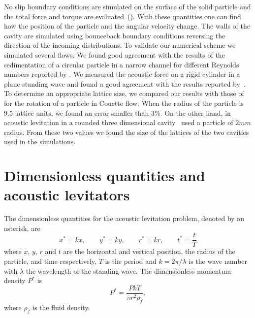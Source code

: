 No slip boundary conditions are simulated on the surface of the solid particle and 
the total force and torque are evaluated~(\cite{aidun98}). With these quantities one can 
find how the position of the particle and the angular velocity change. The walls of the 
cavity are simulated using bounceback boundary conditions reversing the direction of the 
incoming distributions. To validate our numerical scheme we simulated several flows.
We found good agreement with the results of the sedimentation of a circular particle in a 
narrow channel for different Reynolds numbers reported by \cite{feng94}. We measured the 
acoustic force on a rigid cylinder in a plane standing wave and found a good agreement with
the results reported by~\cite{haydock05}. To determine an appropriate lattice size, we 
compared our results with those of~\cite{poe75} for the rotation of a particle in Couette 
flow. When the radius of the particle is 9.5 lattice units, we found an error smaller 
than 3\%. On the other hand, in acoustic levitation in a rounded three dimensional 
cavity~\cite{xie01} used a particle of $2 mm$  radius. From these two values we 
found  the size of the lattices of the two cavities used in the simulations.



\section{\label{sec:acoustic} Dimensionless quantities and acoustic levitators}

The dimensionless quantities for the acoustic levitation problem, denoted by an asterisk,  
are
\begin{equation}
 x^\ast=kx,\qquad y^\ast=ky,\qquad r^\ast=kr,\qquad t^\ast = \frac{t}{T}
\end{equation}
where $x$, $y$, $r$ and $t$ are the horizontal and vertical position, the radius of the
particle, and time respectively, 
$T$ is the period and $k=2\pi/\lambda$ is the wave number with $\lambda$ the wavelength 
of the standing wave. The dimensionless momentum density $P^\ast$ is 
\begin{equation}
 P^\ast = \frac{PkT}{\pi r^2 \rho_f},
\end{equation}
where $\rho_f$ is the fluid density. 

